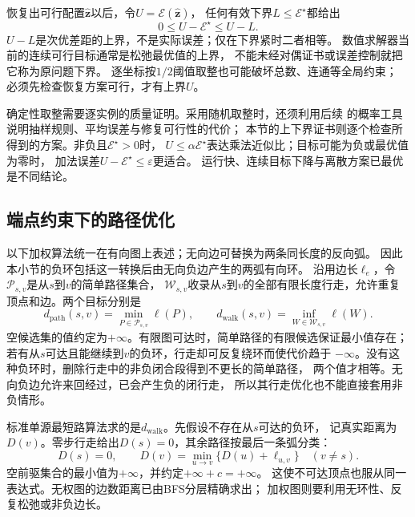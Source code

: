 恢复出可行配置\(\widehat{\bm z}\)以后，令\(U=\mathcal E(\widehat{\bm z})\)，
任何有效下界\(L\leq\mathcal E^\star\)都给出
\[
  0\leq U-\mathcal E^\star\leq U-L.
\]
\(U-L\)是次优差距的上界，不是实际误差；仅在下界紧时二者相等。
数值求解器当前的连续可行目标通常是松弛最优值的上界，
不能未经对偶证书或误差控制就把它称为原问题下界。
逐坐标按\(1/2\)阈值取整也可能破坏总数、连通等全局约束；
必须先检查恢复方案可行，才有上界\(U\)。

确定性取整需要逐实例的质量证明。采用随机取整时，还须利用后续
的概率工具说明抽样规则、平均误差与修复可行性的代价；
本节的上下界证书则逐个检查所得到的方案。非负且\(\mathcal E^\star>0\)时，
\(U\leq\alpha\mathcal E^\star\)表达乘法近似比；目标可能为负或最优值为零时，
加法误差\(U-\mathcal E^\star\leq\varepsilon\)更适合。
运行快、连续目标下降与离散方案已最优是不同结论。

\subsection{端点约束下的路径优化}
\label{sec:graph-theory-shortest-paths}

以下加权算法统一在有向图上表述；无向边可替换为两条同长度的反向弧。
因此本小节的负环包括这一转换后由无向负边产生的两弧有向环。
沿用边长\(\ell_e\)，令\(\mathcal P_{s,v}\)是从\(s\)到\(v\)的简单路径集合，
\(\mathcal W_{s,v}\)收录从\(s\)到\(v\)的全部有限长度行走，允许重复顶点和边。两个目标分别是
\[
  d_{\mathrm{path}}(s,v)=\min_{P\in\mathcal P_{s,v}}\ell(P),
  \qquad
  d_{\mathrm{walk}}(s,v)=\inf_{W\in\mathcal W_{s,v}}\ell(W).
\]
空候选集的值约定为\(+\infty\)。有限图可达时，简单路径的有限候选保证最小值存在；
若有从\(s\)可达且能继续到\(v\)的负环，行走却可反复绕环而使代价趋于
\(-\infty\)。没有这种负环时，删除行走中的非负闭合段得到不更长的简单路径，
两个值才相等。无向负边允许来回经过，已会产生负的闭行走，
所以其行走优化也不能直接套用非负情形。

标准单源最短路算法求的是\(d_{\mathrm{walk}}\)。先假设不存在从\(s\)可达的负环，
记真实距离为\(D(v)\)。零步行走给出\(D(s)=0\)，其余路径按最后一条弧分类：
\begin{equation}
  D(s)=0,\qquad
  D(v)=\min_{u\to v}\{D(u)+\ell_{u,v}\}\quad(v\neq s).
  \label{eq:graph-theory-shortest-path-bellman}
\end{equation}
空前驱集合的最小值为\(+\infty\)，并约定\(+\infty+c=+\infty\)。
这使不可达顶点也服从同一表达式。无权图的边数距离已由BFS分层精确求出；
加权图则要利用无环性、反复松弛或非负边长。

